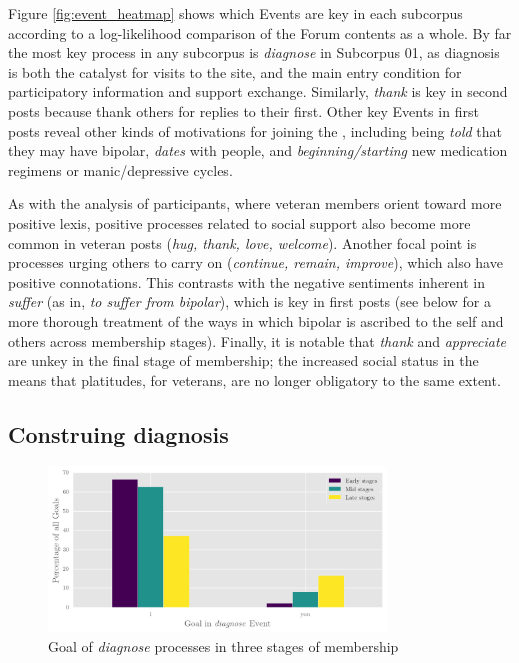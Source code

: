 Figure \ref{fig:event_heatmap} shows which Events are key in each subcorpus according to a log\hyp{}likelihood comparison of the \gls{Forum} contents as a whole. By far the most key process in any subcorpus is \emph{diagnose} in Subcorpus 01, as diagnosis is both the catalyst for visits to the site, and the main entry condition for participatory information and support exchange. Similarly, \emph{thank} is key in second \glspl{post} because  thank others for replies to their first. Other key Events in first \glspl{post} reveal other kinds of motivations for joining the , including being \emph{told} that they may have \gls{bipolar}, \emph{dates} with  people, and \emph{beginning\slash starting} new medication regimens or manic\slash depressive cycles.

As with the analysis of participants, where veteran \glspl{member} orient toward more positive lexis, positive processes related to social support also become more common in veteran \glspl{post} (\emph{hug, thank, love, welcome}). Another focal point is processes urging others to carry on (\emph{continue, remain, improve}), which also have positive connotations. This contrasts with the negative sentiments inherent in \emph{suffer} (as in, \emph{to suffer from bipolar}), which is key in first \glspl{post} (see below for a more thorough treatment of the ways in which bipolar is ascribed to the self and others across membership stages). Finally, it is notable that \emph{thank} and \emph{appreciate} are unkey in the final stage of membership; the increased social status in the  means that platitudes, for veterans, are no longer obligatory to the same extent.

\subsection{Construing diagnosis} \label{sect:diag}


\begin{figure}[htb]
    \centering
    \includegraphics[width=0.8\textwidth]{../images/goal-in-diag-ev.png}
    \caption[Goal of \emph{diagnose} processes]{Goal of \emph{diagnose} processes in three stages of membership}
    \label{fig:part_in_diag}
    \end{figure}

